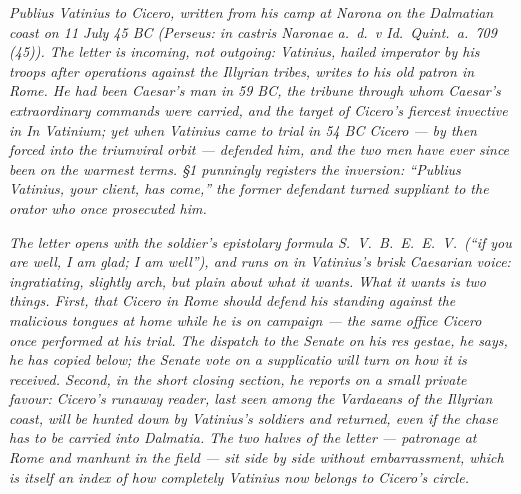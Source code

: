 
\textit{Publius Vatinius to Cicero, written from his camp at
Narona on the Dalmatian coast on 11 July 45 BC (Perseus:
\textit{in castris Naronae a.~d.~v Id.~Quint.~a.~709 (45)}). The
letter is incoming, not outgoing: Vatinius, hailed
\textit{imperator} by his troops after operations against the
Illyrian tribes, writes to his old patron in Rome. He had been
Caesar's man in 59 BC, the tribune through whom Caesar's
extraordinary commands were carried, and the target of Cicero's
fiercest invective in \textit{In Vatinium}; yet when Vatinius
came to trial in 54 BC Cicero --- by then forced into the
triumviral orbit --- defended him, and the two men have ever
since been on the warmest terms. \S 1 punningly registers the
inversion: ``Publius Vatinius, your client, has come,'' the
former defendant turned suppliant to the orator who once
prosecuted him.}

\textit{The letter opens with the soldier's epistolary formula
\textit{S.~V.~B.~E.~E.~V.}\ (``if you are well, I am glad; I
am well''), and runs on in Vatinius's brisk Caesarian voice:
ingratiating, slightly arch, but plain about what it wants.
What it wants is two things. First, that Cicero in Rome should
defend his standing against the malicious tongues at home while
he is on campaign --- the same office Cicero once performed at
his trial. The dispatch to the Senate on his \textit{res gestae},
he says, he has copied below; the Senate vote on a
\textit{supplicatio} will turn on how it is received. Second,
in the short closing section, he reports on a small private
favour: Cicero's runaway reader, last seen among the Vardaeans
of the Illyrian coast, will be hunted down by Vatinius's
soldiers and returned, even if the chase has to be carried into
Dalmatia. The two halves of the letter --- patronage at Rome and
manhunt in the field --- sit side by side without embarrassment,
which is itself an index of how completely Vatinius now belongs
to Cicero's circle.}
